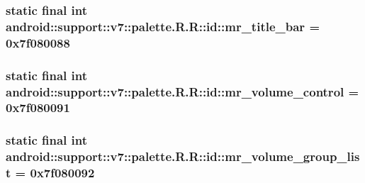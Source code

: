 \hypertarget{classandroid_1_1support_1_1v7_1_1palette_1_1_r_1_1id_07215c29312f02efc3b73c1bea7284ea}{
\subsubsection[{mr\_\-title\_\-bar}]{\setlength{\rightskip}{0pt plus 5cm}static final int android::support::v7::palette.R.R::id::mr\_\-title\_\-bar = 0x7f080088}}
\label{classandroid_1_1support_1_1v7_1_1palette_1_1_r_1_1id_07215c29312f02efc3b73c1bea7284ea}


\hypertarget{classandroid_1_1support_1_1v7_1_1palette_1_1_r_1_1id_abff68c9211c6de1bdfe90537d550e4d}{
\subsubsection[{mr\_\-volume\_\-control}]{\setlength{\rightskip}{0pt plus 5cm}static final int android::support::v7::palette.R.R::id::mr\_\-volume\_\-control = 0x7f080091}}
\label{classandroid_1_1support_1_1v7_1_1palette_1_1_r_1_1id_abff68c9211c6de1bdfe90537d550e4d}


\hypertarget{classandroid_1_1support_1_1v7_1_1palette_1_1_r_1_1id_9bfca8ae0ba4ed8acfefb06008ae827b}{
\subsubsection[{mr\_\-volume\_\-group\_\-list}]{\setlength{\rightskip}{0pt plus 5cm}static final int android::support::v7::palette.R.R::id::mr\_\-volume\_\-group\_\-list = 0x7f080092}}
\label{classandroid_1_1support_1_1v7_1_1palette_1_1_r_1_1id_9bfca8ae0ba4ed8acfefb06008ae827b}


